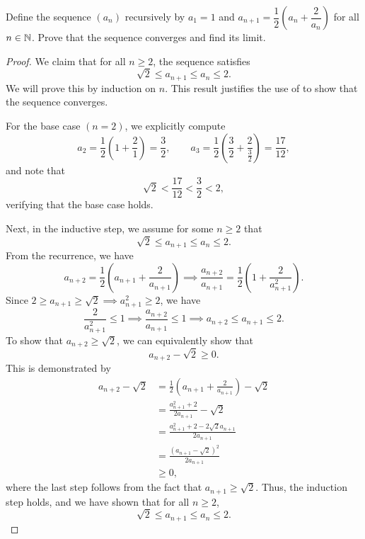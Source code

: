 \begin{problem}
  Define the sequence $(a_{n})$ recursively by $a_{1} = 1$ and $a_{n+1} = \dfrac{1}{2} \left( a_{n} + \dfrac{2}{a_{n}} \right)$ for all $n \in \mathbb{N}$. Prove that the sequence converges and find its limit.

  \begin{proof}
    We claim that for all $n \geq 2$, the sequence satisfies
    \[
      \sqrt{2} \leq a_{n+1} \leq a_{n} \leq 2.
    \]
    We will prove this by induction on $n$.
    This result justifies the use of  to show that the sequence converges.

    For the base case $(n = 2)$, we explicitly compute
    \[
      a_{2} = \frac{1}{2} \left(1 + \frac{2}{1} \right) = \frac{3}{2}, \qquad
      a_{3} = \frac{1}{2} \left( \frac{3}{2} + \frac{2}{\frac{3}{2}} \right) = \frac{17}{12},
    \]
    and note that
    \[
      \sqrt{2} < \frac{17}{12} < \frac{3}{2} < 2,
    \]
    verifying that the base case holds.

    Next, in the inductive step, we assume for some $n \geq 2$ that
    \[
      \sqrt{2} \leq a_{n+1} \leq a_n \leq 2.
    \]
    From the recurrence, we have
    \[
      a_{n+2} = \frac{1}{2} \left( a_{n+1} + \frac{2}{a_{n+1}} \right)
      \implies
      \frac{a_{n+2}}{a_{n+1}} = \frac{1}{2} \left( 1 + \frac{2}{a_{n+1}^2} \right).
    \]
    Since $2 \geq a_{n+1} \geq \sqrt{2} \implies a_{n+1}^{2} \geq 2$, we have 
    \[
      \frac{2}{a_{n+1}^2} \leq 1 \implies \frac{a_{n+2}}{a_{n+1}} \leq 1 \implies a_{n+2} \leq a_{n+1} \leq 2.
    \]
    To show that $a_{n+2} \geq \sqrt{2}$, we can equivalently show that
    \[
      a_{n+2} - \sqrt{2} \geq 0.
    \]
    This is demonstrated by
    \begin{align*}
      a_{n+2} - \sqrt{2} &= \frac{1}{2} \left( a_{n+1} + \frac{2}{a_{n+1}} \right) - \sqrt{2} \\
                         &= \frac{a_{n+1}^{2} + 2}{2a_{n+1}} - \sqrt{2} \\ 
                         &= \frac{a_{n+1}^{2} + 2 - 2\sqrt{2} a_{n+1}}{2 a_{n+1}} \\
                         &= \frac{(a_{n+1} - \sqrt{2})^2}{2 a_{n+1}} \\
                         &\geq 0,
    \end{align*}
    where the last step follows from the fact that $a_{n+1} \geq \sqrt{2}$.
    Thus, the induction step holds, and we have shown that for all $n \geq 2$,
    \[
      \sqrt{2} \leq a_{n+1} \leq a_n \leq 2.
    \]


\end{proof}
\end{problem}
